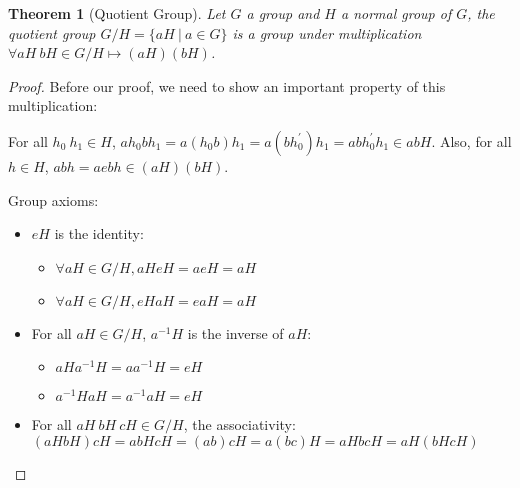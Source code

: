 \documentclass[14pt]{extarticle}
\newtheorem{theorem}{Theorem}[section]
\newcommand{\inv}[1]{#1^{-1}}
\begin{document}
\begin{theorem}[Quotient Group]
  Let $G$ a group and $H$ a normal group of $G$, 
  the quotient group $G/H = \{ aH \ | \ a \in G \}$ is a group under multiplication
  $\forall aH \ bH \in G/H \mapsto (aH)(bH)$.
\end{theorem}

\begin{proof}
  Before our proof, we need to show an important property of this multiplication:

  \begin{center}
  \end{center}

  For all $h_0 \ h_1 \in H$, $ah_0bh_1 = a(h_0b)h_1 = a(bh_0^\prime)h_1 = abh_0^\prime h_1 \in abH$.
  Also, for all $h \in H$, $abh = aebh \in (aH)(bH)$.

  Group axioms:
  \begin{itemize}
    \item $eH$ is the identity:
      \begin{itemize}
        \item $\forall aH \in G/H, aHeH = aeH = aH$
        \item $\forall aH \in G/H, eHaH = eaH = aH$
      \end{itemize}
    \item For all $aH \in G/H$, $\inv{a}H$ is the inverse of $aH$:
      \begin{itemize}
        \item $aH\inv{a}H = a\inv{a}H = eH$
        \item $\inv{a}HaH = \inv{a}aH = eH$
      \end{itemize}
    \item For all $aH \ bH \ cH \in G/H$, the associativity: \\
      $(aHbH)cH = abHcH = (ab)cH = a(bc)H = aHbcH = aH(bHcH)$
  \end{itemize}
\end{proof}
\end{document}
